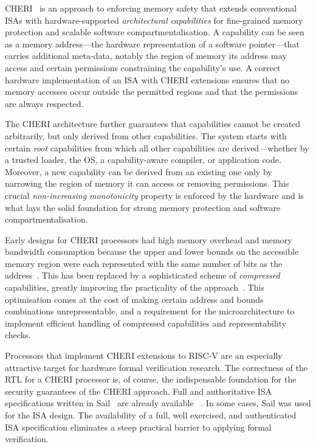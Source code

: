 \documentclass[10pt,conference]{IEEEtran}
\begin{document}
CHERI~\cite{cherimips, introduction-to-cheri} is an approach to enforcing
memory safety that extends conventional ISAs with hardware-supported
\textit{architectural capabilities} for fine-grained memory protection and
scalable software compartmentalisation. A capability can be seen as a
memory address---the hardware representation of a software pointer---that
carries additional meta-data, notably the region of memory its address may
access and certain permissions constraining the capability's use. A correct
hardware implementation of an ISA with CHERI extensions ensures that no
memory accesses occur outside the permitted regions and that the
permissions are always respected.

The CHERI architecture further guarantees that capabilities cannot be
created arbitrarily, but only derived from other capabilities. The system
starts with certain \textit{root} capabilities from which all other
capabilities are derived---whether by a trusted loader, the OS, a
capability-aware compiler, or application code. Moreover, a new capability
can be derived from an existing one only by narrowing the region of memory
it can access or removing permissions. This crucial \textit{non-increasing
  monotonicity} property is enforced by the hardware and is what lays the
solid foundation for strong memory protection and software
compartmentalisation.

Early designs for CHERI processors had high memory overhead and memory
bandwidth consumption because the upper and lower bounds on the accessible
memory region were each represented with the same number of bits as the
address~\cite{cherimips}.  This has been replaced by a sophisticated scheme
of \textit{compressed} capabilities, greatly improving the practicality of
the approach~\cite{CHERIConcentrate}. This optimisation comes at the cost
of making certain address and bounds combinations unrepresentable, and a
requirement for the microarchitecture to implement efficient handling of
compressed capabilities and representability checks.

Processors that implement CHERI extensions to RISC-V are an especially
attractive target for hardware formal verification research. The
correctness of the RTL for a CHERI processor is, of course, the
indispensable foundation for the security guarantees of the CHERI
approach. Full and authoritative ISA specifications written in
Sail~\cite{Sail} are already available ~\cite{cheri-risc-v,cheriot-sail}.
In some cases, Sail was used for the ISA design. The
availability of a full, well exercised, and authenticated ISA specification
eliminates a steep practical barrier to applying formal verification.
\end{document}
